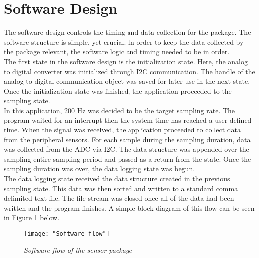 \section{Software Design}
The software design controls the timing and data collection for the
package. The software structure is simple, yet crucial. In order to
keep the data collected by the package relevant, the software
logic and timing needed to be in order. \\

The first state in the software design is the initialization state.
Here, the analog to digital converter was initialized through I2C
communication. The handle of the analog to digital communication
object was saved for later use in the next state. Once the
initialization state was finished, the application proceeded
to the sampling state.\\

In this application, 200 Hz was decided to be the target sampling
rate. The program waited for an interrupt then the system time 
has reached a user-defined time. When the signal was received, the application
proceeded to collect data from the peripheral sensors. For
each sample during the sampling duration, data was collected
from the ADC via I2C. The data structure was appended over the sampling entire
sampling period and passed as a return from the state.
Once the sampling duration was over, the data logging
state was begun. \\

The data logging state received the data structure created in the
previous sampling state. This data was then sorted and written to a
standard comma delimited text file. The file stream was closed
once all of the data had been written and the program finishes. A
simple block diagram of this flow can be seen in Figure
\ref{fig:PRO_SoftFlow} below.

\begin{figure}[H]
\centering
\texttt{[image: "Software flow"]}
\caption{\textit{Software flow of the sensor package}}
\label{fig:PRO_SoftFlow}
\end{figure}